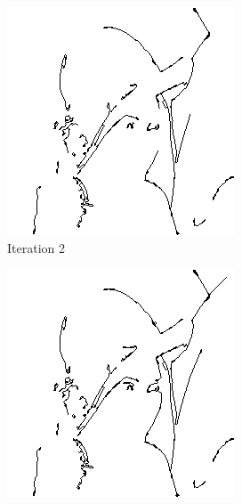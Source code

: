 \documentclass{llncs}
\begin{document}
\begin{figure}
        \vspace{5mm}
        
        \begin{subfigure}[b]{0.3\textwidth}
                \includegraphics[width=\textwidth]{IMG/HeuristicInit/Iteration2}
                \caption{Iteration 2}
                \label{fig:heu_iter2}
        \end{subfigure}%
        \quad
        \begin{subfigure}[b]{0.3\textwidth}
                \includegraphics[width=\textwidth]{IMG/HeuristicInit/Iteration3}

\end{subfigure}
\end{figure}
\end{document}
